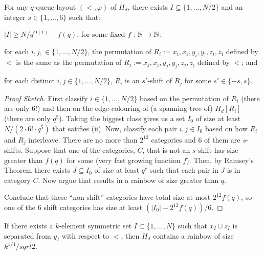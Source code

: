 \documentclass{patmorin}
\begin{document}
\begin{lem}
  For any $q$-queue layout $(<,\varphi)$  of $H_d$, there exists $I\subseteq\{1,\ldots,N/2\}$ and an integer $s\in\{1,\ldots,6\}$ such that:
  \begin{compactenum}[(i)]
    \item $|I|\ge N/q^{O(1)}-f(q)$, for some fixed $f:\mathbb{N}\to\mathbb{N}$;

    \item for each $i,j,\in\{1,\ldots,N/2\}$, the permutation of $R_i:=x_i,x_{\overline{\imath}},y_i,y_{\overline{\imath}},z_i,z_{\overline{\imath}}$ defined by $<$ is the same as the permutation of $R_j:=x_j,x_{\overline{\jmath}},y_j,y_{\overline{\jmath}},z_j,z_{\overline{\jmath}}$ defined by $<$; and

    \item for each distinct $i,j\in\{1,\ldots,N/2\}$, $R_i$ is an $s'$-shift of $R_j$ for some $s'\in\{-s,s\}$.
  \end{compactenum}
\end{lem}

\begin{proof}[Proof Sketch]
  First classify $i\in\{1,\ldots,N/2\}$ based on the permutation of $R_i$ (there are only $6!$) and then on the edge-colouring of (a spanning tree of) $H_d[R_i]$ (there are only $q^5$).  Taking the biggest class gives us a set $I_0$ of size at least $N/(2\cdot 6!\cdot q^5)$ that satifies (ii).  Now, classify each pair $i,j\in I_0$ based on how $R_i$ and $R_j$ interleave.  There are no more than $2^{12}$ categories and $6$ of them are $s$-shifts.  Suppose that one of the categories, $C$, that is not an $s$-shift has size greater than $f(q)$ for some (very fast growing function $f$).  Then, by Ramsey's Theorem there exists $J\subseteq I_0$ of size at least $q^c$ such that each pair in $J$ is in category $C$. Now argue that results in a rainbow of size greater than $q$.

  Conclude that these ``non-shift'' categories have total size at most $2^{12}f(q)$, so one of the $6$ shift categories has size at least $(|I_0|-2^{12}f(q))/6$.
\end{proof}



\begin{lem}
    If there exists a $k$-element symmetric set $I\subset\{1,\ldots,N\}$ such that $x_I\cup z_I$ is separated from $y_I$ with respect to $<$, then $H_d$ contains a rainbow of size $k^{1/4}/sqrt{2}$.
\end{lem}
\end{document}
